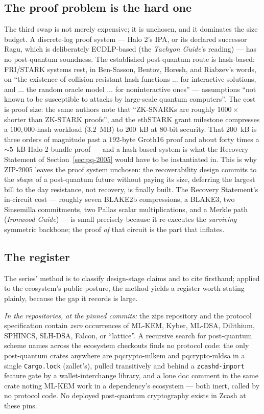 \documentclass[11pt,a4paper]{article}
\theoremstyle{definition}
\begin{document}
\subsection{The proof problem is the hard one}\label{sec:pq-proof}

The third swap is not merely expensive; it is unchosen, and it dominates
the size budget. A discrete-log proof system --- Halo 2's IPA, or its
declared successor Ragu, which is deliberately ECDLP-based (the
\emph{Tachyon Guide}'s reading) --- has no post-quantum soundness. The
established post-quantum route is hash-based: FRI/STARK systems rest, in
Ben-Sasson, Bentov, Horesh, and Riabzev's words, on ``the existence of
collision-resistant hash functions $\ldots$ for interactive solutions,
and $\ldots$ the random oracle model $\ldots$ for noninteractive ones''
--- assumptions ``not known to be susceptible to attacks by large-scale
quantum computers''. The cost is proof size: the same authors note that
``ZK-SNARKs are roughly $1000\times$ shorter than ZK-STARK proofs'', and
the ethSTARK grant milestone compresses a $100{,}000$-hash workload
($3.2$~MB) to $200$~kB at $80$-bit security. That $200$~kB is three
orders of magnitude past a $192$-byte Groth16 proof and about forty
times a $\sim$$5$~kB Halo 2 bundle proof --- and a hash-based system is
what the
Recovery Statement of Section~\ref{sec:pq-2005} would have to be
instantiated in. This is why ZIP-2005 leaves the proof system unchosen:
the recoverability design commits to the \emph{shape} of a
post-quantum future without paying its size, deferring the largest bill
to the day resistance, not recovery, is finally built. The Recovery
Statement's in-circuit cost --- roughly seven BLAKE2b compressions, a
BLAKE3, two Sinsemilla commitments, two Pallas scalar multiplications,
and a Merkle path (\emph{Ironwood Guide}) --- is small precisely
because it re-executes the \emph{surviving} symmetric backbone; the
proof \emph{of} that circuit is the part that inflates.

\subsection{The register}\label{sec:pq-register}

The series' method is to classify design-stage claims and to cite
firsthand; applied to the ecosystem's public posture, the method yields
a register worth stating plainly, because the gap it records is large.

\emph{In the repositories, at the pinned commits:} the zips repository
and the protocol specification contain \emph{zero} occurrences of
ML-KEM, Kyber, ML-DSA, Dilithium, SPHINCS, SLH-DSA, Falcon, or
``lattice''. A recursive search for post-quantum scheme names across
the ecosystem checkouts finds no protocol code: the only post-quantum
crates anywhere are \textsf{pqcrypto-mlkem} and \textsf{pqcrypto-mldsa}
in a single \texttt{Cargo.lock} (\textsf{zallet}'s), pulled
transitively and behind a \texttt{zcashd-import} feature gate by a
wallet-interchange library, and a lone doc comment in the same crate
noting ML-KEM work in a dependency's ecosystem --- both inert, called
by no protocol code. No deployed post-quantum cryptography exists in
Zcash at these pins.
\end{document}
